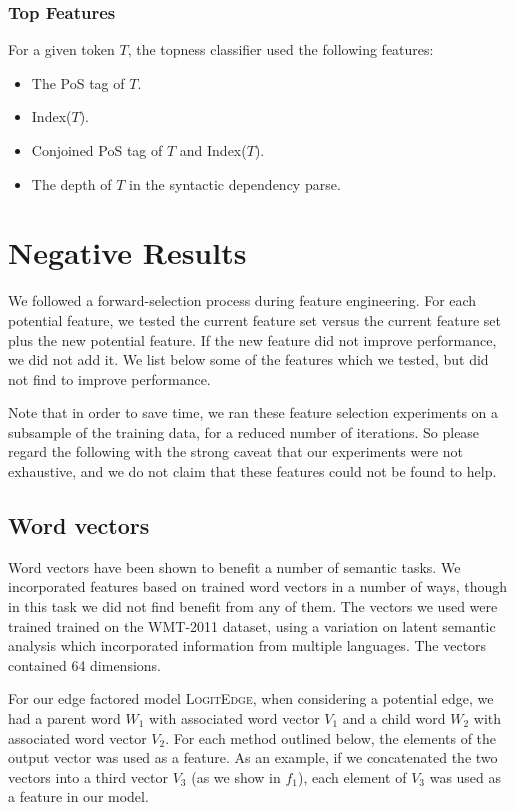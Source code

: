 \documentclass[11pt]{article}
\newcommand{\logitedge}{\textsc{LogitEdge}}
\begin{document}
\subsubsection{Top Features}
For a given token $T$, the topness classifier used the following features:
\begin{itemize}
\item The PoS tag of $T$.
\item Index($T$).
\item Conjoined PoS tag of $T$ and Index($T$).
\item The depth of $T$ in the syntactic dependency parse. 
\end{itemize}






\section{Negative Results}
\label{s:badfeatures}

We followed a forward-selection process during feature engineering.
For each potential feature, we tested the current feature set versus the current
feature set plus the new potential feature.
If the new feature did not improve performance, we did not add it.
We list below some of the features which we tested, but did not find to improve
performance.

Note that in order to save time, we ran these feature selection experiments
on a subsample of the training data, for a reduced number of iterations.
So please regard the following with the strong caveat that our experiments were
not exhaustive, and we do not claim that these features could not be found to
help.

\subsection{Word vectors}
Word vectors have been shown to benefit a number of semantic tasks. We
incorporated features based on trained word vectors in a number of ways, though
in this task we did not find benefit from any of them.
The vectors we used \cite{wordVectors} were trained trained on the WMT-2011
dataset, using a variation on latent semantic analysis which incorporated
information from multiple languages.
The vectors contained 64 dimensions.

For our edge factored model \logitedge, when considering a potential edge, we
had a parent word $W_1$ with associated word vector $V_1$ and a child word
$W_2$ with associated word vector $V_2$.
For each method outlined below, the elements of the output vector was used as a
feature.
As an example, if we concatenated the two vectors into a third vector $V_3$ (as
we show in $f_1$), each element of $V_3$ was used as a feature in our model.
\end{document}
